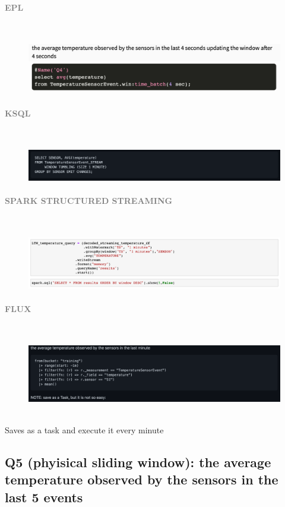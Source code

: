 \documentclass[10pt,a4paper]{article}
\newcommand{\myparagraph}[1]{\paragraph{\normalsize{\textcolor{gray}{\uppercase{\textbf{#1}}}} }\mbox{} \vspace{0.5em}\\}
\begin{document}
\myparagraph{EPL}
\begin{figure}[h!]
 \hfill \includegraphics[width=400pt]{images/epl_Q4}\hspace*{\fill}
\end{figure}
\myparagraph{KSQL}
\begin{figure}[h!]
 \hfill \includegraphics[width=400pt]{images/ksql_Q4}\hspace*{\fill}
\end{figure}
\myparagraph{Spark Structured Streaming}
\begin{figure}[h!]
 \hfill \includegraphics[width=400pt]{images/sss_Q4}\hspace*{\fill}
\end{figure}
\myparagraph{Flux}
\begin{figure}[h!]
 \hfill \includegraphics[width=400pt]{images/flux_Q4}\hspace*{\fill}
\end{figure} \\
Saves as a task and execute it every minute

\pagebreak

\subsection{Q5 (phyisical sliding window): the average temperature observed by the sensors in the last 5 events}
\end{document}
